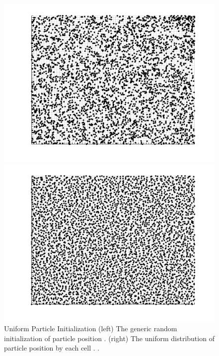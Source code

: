 \begin{figure}
    \centering
  \begin{minipage}[b]{0.49\textwidth}
    \includegraphics[width=\textwidth]{figures/psudo_init.png}
  \end{minipage} %
  \begin{minipage}[b]{0.49\textwidth}
    \includegraphics[width=\textwidth]{figures/uniform_init.png}

  \end{minipage}
  \caption[Uniform Particle Initialization]{Uniform Particle Initialization (left) The generic random initialization of particle position \cite{mac_thesis}. (right) The uniform distribution of particle position by each cell \cite{mac_thesis}. .}
  \label{fig:part_init}
\end{figure}

